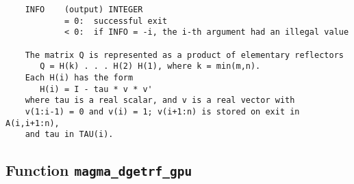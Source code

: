 \documentclass[10pt]{book}
\begin{document}
\begin{verbatim}
    INFO    (output) INTEGER
            = 0:  successful exit
            < 0:  if INFO = -i, the i-th argument had an illegal value

    The matrix Q is represented as a product of elementary reflectors
       Q = H(k) . . . H(2) H(1), where k = min(m,n).
    Each H(i) has the form
       H(i) = I - tau * v * v'
    where tau is a real scalar, and v is a real vector with
    v(1:i-1) = 0 and v(i) = 1; v(i+1:n) is stored on exit in A(i,i+1:n),
    and tau in TAU(i).
\end{verbatim}


\newpage
\subsection{Function {\tt {\bf magma\_dgetrf\_gpu}}}
\end{document}
